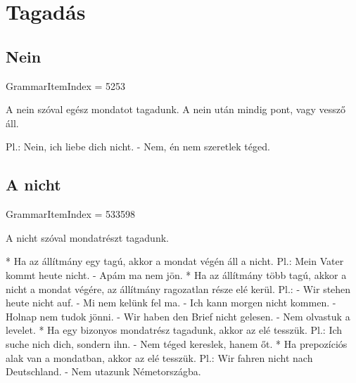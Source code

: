 \documentclass{article}
\newenvironment{desc}{\verbatim}{\endverbatim}
\newenvironment{exmp}{\verbatim}{\endverbatim}
\begin{document}
\section{Tagadás}

\subsection{Nein}

GrammarItemIndex = 5253

\begin{desc}
A nein szóval egész mondatot tagadunk. A nein után mindig pont, vagy vessző áll.

Pl.: Nein, ich liebe dich nicht. - Nem, én nem szeretlek téged.
\end{desc}

\begin{exmp}
\end{exmp}

\subsection{A nicht}

GrammarItemIndex = 533598

\begin{desc}
A nicht szóval mondatrészt tagadunk.

* Ha az állítmány egy tagú, akkor a mondat végén áll a nicht.
  Pl.: Mein Vater kommt heute nicht. - Apám ma nem jön.
* Ha az állítmány több tagú, akkor a nicht a mondat végére, az állítmány ragozatlan része elé kerül.
  Pl.: - Wir stehen heute nicht auf. - Mi nem kelünk fel ma.
       - Ich kann morgen nicht kommen. - Holnap nem tudok jönni.
       - Wir haben den Brief nicht gelesen. - Nem olvastuk a levelet.
* Ha egy bizonyos mondatrész tagadunk, akkor az elé tesszük.
  Pl.: Ich suche nich dich, sondern ihn. - Nem téged kereslek, hanem őt.
* Ha prepozíciós alak van a mondatban, akkor az elé tesszük.
  Pl.: Wir fahren nicht nach Deutschland. - Nem utazunk Németországba.
\end{desc}
\end{document}
